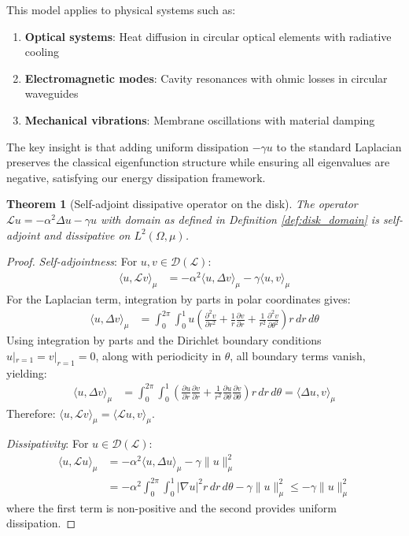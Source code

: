 \documentclass[a4paper,12pt]{article}
\newtheorem{theorem}{Theorem}[section]
\newcommand{\inner}[2]{\langle #1, #2 \rangle}
\begin{document}
This model applies to physical systems such as:
\begin{enumerate}
\item \textbf{Optical systems}: Heat diffusion in circular optical elements with radiative cooling
\item \textbf{Electromagnetic modes}: Cavity resonances with ohmic losses in circular waveguides  
\item \textbf{Mechanical vibrations}: Membrane oscillations with material damping
\end{enumerate}

The key insight is that adding uniform dissipation $-\gamma u$ to the standard Laplacian preserves the classical eigenfunction structure while ensuring all eigenvalues are negative, satisfying our energy dissipation framework.

\begin{theorem}[Self-adjoint dissipative operator on the disk]\label{thm:disk_operator}
The operator $\mathcal{L}u = -\alpha^2 \Delta u - \gamma u$ with domain as defined in Definition \ref{def:disk_domain} is self-adjoint and dissipative on $L^2(\Omega, \mu)$.
\end{theorem}

\begin{proof}
\textit{Self-adjointness}: For $u,v \in \mathcal{D}(\mathcal{L})$:
\begin{align}
\inner{u}{\mathcal{L}v}_\mu &= -\alpha^2 \inner{u}{\Delta v}_\mu - \gamma \inner{u}{v}_\mu
\end{align}
For the Laplacian term, integration by parts in polar coordinates gives:
\begin{align}
\inner{u}{\Delta v}_\mu &= \int_0^{2\pi} \int_0^1 u \left(\frac{\partial^2 v}{\partial r^2} + \frac{1}{r}\frac{\partial v}{\partial r} + \frac{1}{r^2}\frac{\partial^2 v}{\partial \theta^2}\right) r\,dr\,d\theta
\end{align}
Using integration by parts and the Dirichlet boundary conditions $u|_{r=1} = v|_{r=1} = 0$, along with periodicity in $\theta$, all boundary terms vanish, yielding:
\begin{align}
\inner{u}{\Delta v}_\mu &= \int_0^{2\pi} \int_0^1 \left(\frac{\partial u}{\partial r}\frac{\partial v}{\partial r} + \frac{1}{r^2}\frac{\partial u}{\partial \theta}\frac{\partial v}{\partial \theta}\right) r\,dr\,d\theta = \inner{\Delta u}{v}_\mu
\end{align}
Therefore: $\inner{u}{\mathcal{L}v}_\mu = \inner{\mathcal{L}u}{v}_\mu$.

\textit{Dissipativity}: For $u \in \mathcal{D}(\mathcal{L})$:
\begin{align}
\inner{u}{\mathcal{L}u}_\mu &= -\alpha^2 \inner{u}{\Delta u}_\mu - \gamma \|u\|_\mu^2\\
&= -\alpha^2 \int_0^{2\pi} \int_0^1 \left|\nabla u\right|^2 r\,dr\,d\theta - \gamma \|u\|_\mu^2 \leq -\gamma \|u\|_\mu^2
\end{align}
where the first term is non-positive and the second provides uniform dissipation.
\end{proof}
\end{document}
